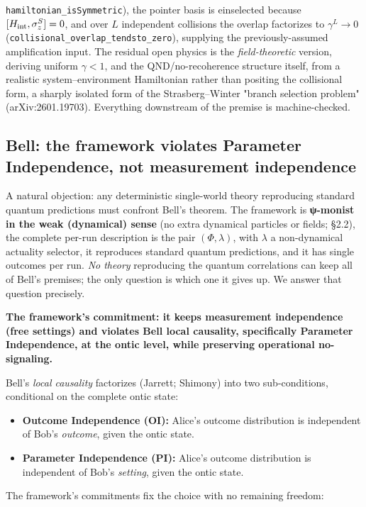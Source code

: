\documentclass[11pt,a4paper]{article}
\begin{document}
\texttt{hamiltonian\_isSymmetric}), the pointer basis is einselected because $[H_{\rm int},\sigma_z^S]=0$, and over $L$ independent collisions the overlap factorizes to $\gamma^L \to 0$ (\texttt{collisional\_overlap\_tendsto\_zero}), supplying the previously-assumed amplification input. The residual open physics is the \emph{field-theoretic} version, deriving uniform $\gamma<1$, and the QND/no-recoherence structure itself, from a realistic system–environment Hamiltonian rather than positing the collisional form, a sharply isolated form of the Strasberg–Winter "branch selection problem" (arXiv:2601.19703). Everything downstream of the premise is machine-checked.

\subsection{Bell: the framework violates Parameter Independence, not measurement independence}

A natural objection: any deterministic single-world theory reproducing standard quantum predictions must confront Bell's theorem. The framework is \textbf{ψ-monist in the weak (dynamical) sense} (no extra dynamical particles or fields; §2.2), the complete per-run description is the pair $(\Phi, \lambda)$, with $\lambda$ a non-dynamical actuality selector, it reproduces standard quantum predictions, and it has single outcomes per run. \emph{No theory} reproducing the quantum correlations can keep all of Bell's premises; the only question is which one it gives up. We answer that question precisely.

\textbf{The framework's commitment: it keeps measurement independence (free settings) and violates Bell local causality, specifically Parameter Independence, at the ontic level, while preserving operational no-signaling.}

Bell's \emph{local causality} factorizes (Jarrett; Shimony) into two sub-conditions, conditional on the complete ontic state:

\begin{itemize}
  \item \textbf{Outcome Independence (OI):} Alice's outcome distribution is independent of Bob's \emph{outcome}, given the ontic state.
  \item \textbf{Parameter Independence (PI):} Alice's outcome distribution is independent of Bob's \emph{setting}, given the ontic state.
\end{itemize}

The framework's commitments fix the choice with no remaining freedom:
\end{document}
